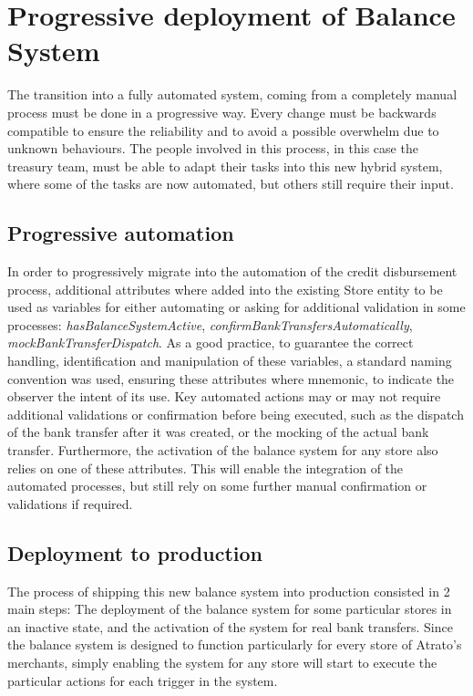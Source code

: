 \chapter{Progressive deployment of Balance System}

The transition into a fully automated system, coming from a completely manual process must be done in a progressive way. Every change must be backwards compatible to ensure the reliability and to avoid a possible overwhelm due to unknown behaviours. The people involved in this process, in this case the treasury team, must be able to adapt their tasks into this new hybrid system, where some of the tasks are now automated, but others still require their input.

\section{Progressive automation}

In order to progressively migrate into the automation of the credit disbursement process, additional attributes where added into the existing Store entity to be used as variables for either automating or asking for additional validation in some processes: \textit{hasBalanceSystemActive}, \textit{confirmBankTransfersAutomatically}, \textit{mockBankTransferDispatch}. As a good practice, to guarantee the correct handling, identification and manipulation of these variables, a standard naming convention was used, ensuring these attributes where mnemonic, to indicate the observer the intent of its use. \cite{oracle} Key automated actions may or may not require additional validations or confirmation before being executed, such as the dispatch of the bank transfer after it was created, or the mocking of the actual bank transfer. Furthermore, the activation of the balance system for any store also relies on one of these attributes.  This will enable the integration of the automated processes, but still rely on some further manual confirmation or validations if required.\\

\section{Deployment to production}

The process of shipping this new balance system into production consisted in 2 main steps: The deployment of the balance system for some particular stores in an inactive state, and the activation of the system for real bank transfers. Since the balance system is designed to function particularly for every store of Atrato's merchants, simply enabling the system for any store will start to execute the particular actions for each trigger in the system.\\
    
